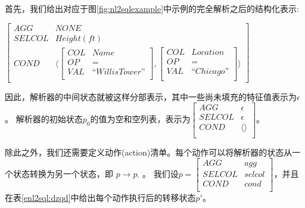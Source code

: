 首先，我们给出对应于图\ref{fig:nl2sqlexample}中示例的完全解析之后的结构化表示:
  

$\begin{bmatrix}
  AGG    &  NONE  \\
  SELCOL &  Height(ft) \\
  COND   &   \langle
    \begin{bmatrix}
      COL  &  Name \\
      OP   &  =    \\
      VAL  &  “Willis Tower”\\
    \end{bmatrix}
    ,
    \begin{bmatrix}
      COL  &  Location \\
      OP   &  =    \\
      VAL  &  “Chicago”\\
    \end{bmatrix}
    \rangle
  \end{bmatrix}$

因此，解析器的中间状态就被这样分部表示，其中一些尚未填充的特征值表示为$\epsilon$。
解析器的初始状态$p_{0}$的值为空和空列表，表示为$\begin{bmatrix}
  AGG    &  \epsilon  \\
  SELCOL &  \epsilon \\
  COND   &   \langle \rangle\\
  \end{bmatrix}$。

除此之外，我们还需要定义动作(action)清单。每个动作可以将解析器的状态从一个状态转换为另一个状态，即 $p \rightarrow p_{'}$ 。
我们设$p = \begin{bmatrix}
  AGG    &  agg  \\
  SELCOL &  selcol \\
  COND   &   cond\\
  \end{bmatrix}$，并且在表\ref{enl2sql:dzqd}中给出每个动作执行后的转移状态$p'$。

